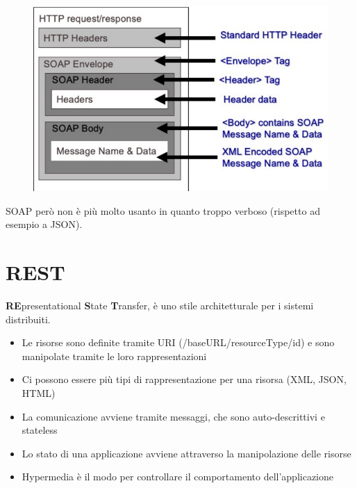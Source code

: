 \documentclass[12pt, a4paper]{article}
\begin{document}
    \begin{figure}[htbp]
        \centering
        \includegraphics[scale=0.5]{soap_components.png}
    \end{figure}
    SOAP però non è più molto usanto in quanto troppo verboso (rispetto ad esempio a JSON). 













    \newpage
    \section{REST}
    \textbf{RE}presentational \textbf{S}tate \textbf{T}ransfer, è uno stile architetturale per i sistemi distribuiti.
    \begin{itemize}
        \item Le risorse sono definite tramite URI (/baseURL/resourceType/{id}) e sono manipolate tramite le loro rappresentazioni
        \item Ci possono essere più tipi di rappresentazione per una risorsa (XML, JSON, HTML)
        \item La comunicazione avviene tramite messaggi, che sono auto-descrittivi e stateless
        \item Lo stato di una applicazione avviene attraverso la manipolazione delle risorse
        \item Hypermedia è il modo per controllare il comportamento dell'applicazione
    \end{itemize}
\end{document}
